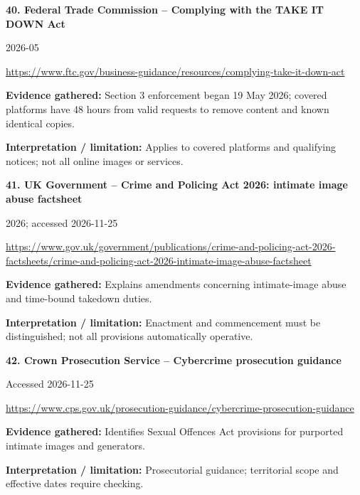 \documentclass[11pt,a4paper]{article}
\begin{document}
\noindent\begin{minipage}{\linewidth}\textbf{40. Federal Trade Commission -- Complying with the TAKE IT DOWN Act}\par{\small 2026-05\par\url{https://www.ftc.gov/business-guidance/resources/complying-take-it-down-act}}\par
\textbf{Evidence gathered:} Section 3 enforcement began 19 May 2026; covered platforms have 48 hours from valid requests to remove content and known identical copies.\par\textbf{Interpretation / limitation:} Applies to covered platforms and qualifying notices; not all online images or services.\par
\end{minipage}\par\vspace{2mm}
\noindent\begin{minipage}{\linewidth}\textbf{41. UK Government -- Crime and Policing Act 2026: intimate image abuse factsheet}\par{\small 2026; accessed 2026-11-25\par\url{https://www.gov.uk/government/publications/crime-and-policing-act-2026-factsheets/crime-and-policing-act-2026-intimate-image-abuse-factsheet}}\par
\textbf{Evidence gathered:} Explains amendments concerning intimate-image abuse and time-bound takedown duties.\par\textbf{Interpretation / limitation:} Enactment and commencement must be distinguished; not all provisions automatically operative.\par
\end{minipage}\par\vspace{2mm}
\noindent\begin{minipage}{\linewidth}\textbf{42. Crown Prosecution Service -- Cybercrime prosecution guidance}\par{\small Accessed 2026-11-25\par\url{https://www.cps.gov.uk/prosecution-guidance/cybercrime-prosecution-guidance}}\par
\textbf{Evidence gathered:} Identifies Sexual Offences Act provisions for purported intimate images and generators.\par\textbf{Interpretation / limitation:} Prosecutorial guidance; territorial scope and effective dates require checking.\par
\end{minipage}\par\vspace{2mm}
\end{document}
